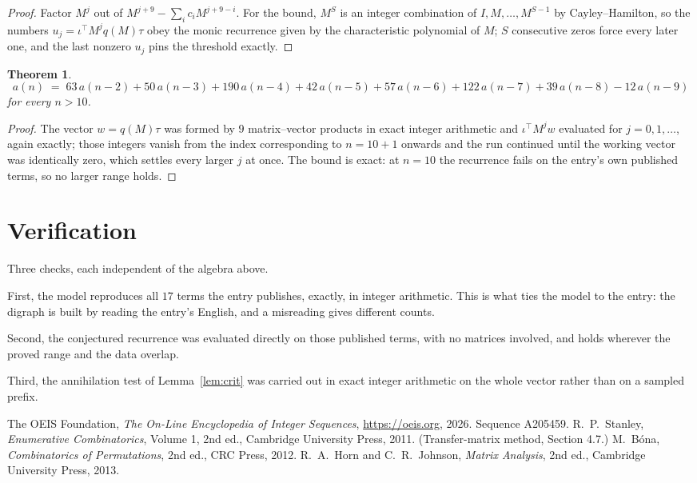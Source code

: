 \documentclass[11pt,a4paper]{article}
\theoremstyle{plain}
\newtheorem{theorem}{Theorem}
\theoremstyle{definition}
\begin{document}
\begin{proof}
Factor $M^{j}$ out of $M^{j+9}-\sum_ic_iM^{j+9-i}$. For the bound, $M^{S}$
is an integer combination of $I,M,\dots,M^{S-1}$ by Cayley--Hamilton, so the numbers
$u_j=\iota^{\!\top}M^{j}q(M)\tau$ obey the monic recurrence given by the characteristic
polynomial of $M$; $S$ consecutive zeros force every later one, and the last nonzero $u_j$
pins the threshold exactly.
\end{proof}

\begin{theorem}
\[
a(n)\;=\;63\,a(n-2) + 50\,a(n-3) + 190\,a(n-4) + 42\,a(n-5) + 57\,a(n-6) + 122\,a(n-7) + 39\,a(n-8) - 12\,a(n-9)
\]
for every $n>10$.
\end{theorem}

\begin{proof}
The vector $w=q(M)\tau$ was formed by $9$ matrix--vector products in exact integer
arithmetic and $\iota^{\!\top}M^{j}w$ evaluated for $j=0,1,\dots$, again exactly; those
integers vanish from the index corresponding to $n=10+1$ onwards and the run continued
until the working vector was identically zero, which settles every larger $j$ at once. The bound is exact: at $n=10$ the recurrence fails on the entry's own published terms, so no larger range holds.
\end{proof}

\section{Verification}

Three checks, each independent of the algebra above.

First, the model reproduces all $17$ terms the entry publishes, exactly, in integer
arithmetic. This is what ties the model to the entry: the digraph is built by reading the
entry's English, and a misreading gives different counts.

Second, the conjectured recurrence was evaluated directly on those published terms, with no
matrices involved, and holds wherever the proved range and the data overlap.

Third, the annihilation test of Lemma~\ref{lem:crit} was carried out in exact integer
arithmetic on the whole vector rather than on a sampled prefix.

\begin{thebibliography}{9}
 The OEIS Foundation, \emph{The On-Line Encyclopedia of Integer
Sequences}, \url{https://oeis.org}, 2026. Sequence A205459.
 R.~P.~Stanley, \emph{Enumerative Combinatorics}, Volume 1, 2nd ed.,
Cambridge University Press, 2011. (Transfer-matrix method, Section 4.7.)
 M.~B\'ona, \emph{Combinatorics of Permutations}, 2nd ed., CRC
Press, 2012.
 R.~A.~Horn and C.~R.~Johnson, \emph{Matrix Analysis}, 2nd ed., Cambridge
University Press, 2013.
\end{thebibliography}
\end{document}
